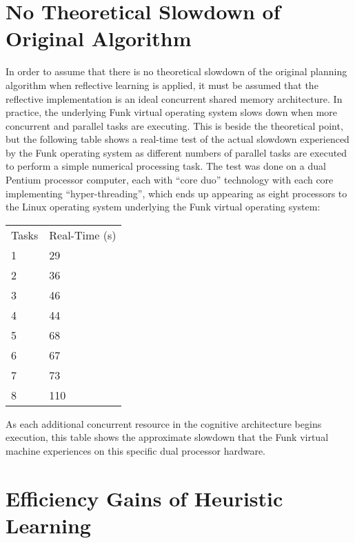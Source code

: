 \section{No Theoretical Slowdown of Original Algorithm}

In order to assume that there is no theoretical slowdown of the
original planning algorithm when reflective learning is applied, it
must be assumed that the reflective implementation is an ideal
concurrent shared memory architecture.  In practice, the underlying
Funk virtual operating system slows down when more concurrent and
parallel tasks are executing.  This is beside the theoretical point,
but the following table shows a real-time test of the actual slowdown
experienced by the Funk operating system as different numbers of
parallel tasks are executed to perform a simple numerical processing
task.  The test was done on a dual Pentium processor computer, each
with ``core duo'' technology with each core implementing
``hyper-threading'', which ends up appearing as eight processors to
the Linux operating system underlying the Funk virtual operating
system:

\vspace{5mm}
\begin{tabular}{ll}
Tasks & Real-Time (s) \\
1 & 29\\
2 & 36\\
3 & 46\\
4 & 44\\
5 & 68\\
6 & 67\\
7 & 73\\
8 & 110\\
\end{tabular}
\vspace{5mm}

As each additional concurrent resource in the cognitive architecture
begins execution, this table shows the approximate slowdown that the
Funk virtual machine experiences on this specific dual processor
hardware.

\section{Efficiency Gains of Heuristic Learning}

